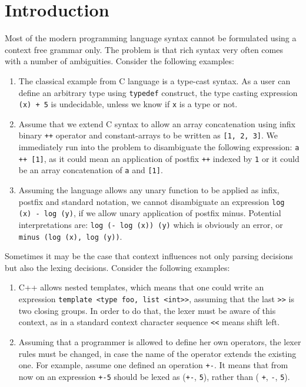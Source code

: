 \section{Introduction}
\label{sec:intro}
Most of the modern programming language syntax cannot be formulated
using a context free grammar only.  The problem is that rich
syntax very often comes with a number of ambiguities.  Consider the 
following examples:
\begin{enumerate}
    \item The classical example from C language is a type-cast 
          syntax.  As a user can define an arbitrary type using
          \verb|typedef| construct, the type casting expression
          \verb|(x) + 5| is undecidable, unless we know if
          \verb|x| is a type or not.
    \item Assume that we extend C syntax to allow an array 
          concatenation using infix binary \verb|++| operator and
          constant-arrays to be written as \verb|[1, 2, 3]|.
          We immediately run into the problem to disambiguate the 
          following expression: \verb|a ++ [1]|, as it could mean
          an application of postfix \verb|++| indexed by \verb|1|
          or it could be an array concatenation of \verb|a| and 
          \verb|[1]|.
    \item Assuming the language allows any unary function to be
          applied as infix, postfix and standard notation, we cannot 
          disambiguate an expression \verb|log (x) - log (y)|, if
          we allow unary application of postfix minus.  Potential
          interpretations are: \verb|log (- log (x)) (y)| which is
          obviously an error, or \verb|minus (log (x), log (y))|.
\end{enumerate}

Sometimes it may be the case that context influences not only
parsing decisions but also the lexing decisions.  Consider
the following examples:
\begin{enumerate}
    \item C++ allows nested templates, which means that one could
          write an expression \verb|template <type foo, list <int>>|, 
          assuming that the last \verb|>>| is two closing groups.  In
          order to do that, the lexer must be aware of this context,
          as in a standard context character sequence \verb|<<| means
          shift left.
    \item Assuming that a programmer is allowed to define her own 
          operators, the lexer rules must be changed, in case 
          the name of the operator extends the existing one.  For
          example, assume one defined an operation \verb|+-|.
          It means that from now on an expression \verb|+-5| should
          be lexed as (\verb|+-|, \verb|5|), rather than (
          \verb|+|, \verb|-|, \verb|5|).
\end{enumerate}


